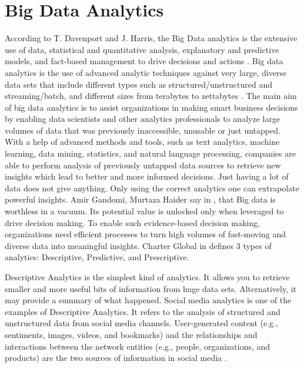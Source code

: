 \documentclass[runningheads]{llncs}
\begin{document}
\section{Big Data Analytics}
According to T. Davenport and J. Harris, the Big Data analytics is the extensive use of data, statistical and quantitative analysis, explanatory and predictive models, and fact-based management to drive decisions and actions \cite{DAVBOOK}. Big data analytics is the use of advanced analytic techniques against very large, diverse data sets that include different types such as structured/unstructured and streaming/batch, and different sizes from terabytes to zettabytes \cite{IBM}. The main aim of big data analytics is to assist organizations in making smart business decisions by enabling data scientists and other analytics professionals to analyze large volumes of data that  was previously inaccessible, unusable or just untapped.  With a help of advanced methods and tools, such as text analytics, machine learning, data mining, statistics, and natural language processing, companies are able to perform analysis of previously untapped data sources to retrieve new insights which lead to better and more informed decisions. Just having a lot of data does not give anything. Only using the correct analytics one can extrapolate powerful insights. Amir Gandomi, Murtaza Haider say in \cite{ELS}, that Big data is worthless in a vacuum. Its potential value is unlocked only when leveraged to drive decision making. To enable such evidence-based decision making, organizations need efficient processes to turn high volumes of fast-moving and diverse data into meaningful insights. Charter Global in \cite{CHARTER} defines 3 types of analytics: Descriptive, Predictive, and Prescriptive. 

Descriptive Analytics is the simplest kind of analytics. It allows you to retrieve smaller and more useful bits of information from huge data sets. Alternatively, it may provide a summary of what happened. Social media analytics is one of the examples of Descriptive Analytics. It refers to the analysis of structured and unstructured data from social media channels. User-generated content (e.g., sentiments, images, videos, and bookmarks) and the relationships and interactions between the network entities (e.g., people, organizations, and products) are the two sources of information in social media \cite{ELS}. 
\end{document}
